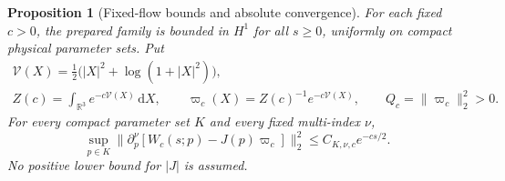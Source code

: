 \documentclass[11pt]{article}
\numberwithin{equation}{section}
\newtheorem{proposition}[theorem]{Proposition}
\newcommand{\dd}{\,\mathrm d}
\newcommand{\R}{\mathbb R}
\begin{document}
\begin{proposition}[Fixed-flow bounds and absolute convergence]
\label{fcg:fixedlimit}
For each fixed $c>0$, the prepared family is bounded in $H^1$ for all
$s\ge0$, uniformly on compact physical parameter sets. Put
\[
 \begin{gathered}
 \mathcal V(X)=\tfrac12\bigl(|X|^2+\log(1+|X|^2)\bigr),\\
 Z(c)=\int_{\R^3}e^{-c\mathcal V(X)}\dd X,\qquad
 \varpi_c(X)=Z(c)^{-1}e^{-c\mathcal V(X)},\qquad Q_c=\|\varpi_c\|_2^2>0.
 \end{gathered}
\]
For every compact parameter set $K$ and every fixed multi-index $\nu$,
\begin{equation}\label{fcg:uniformfixedlimit}
 \sup_{p\in K}
 \|\partial_p^\nu[W_c(s;p)-J(p)\varpi_c]\|_2^2
 \le C_{K,\nu,c}e^{-cs/2}.
\end{equation}
No positive lower bound for $|J|$ is assumed.
\end{proposition}
\end{document}
